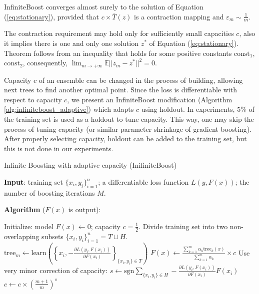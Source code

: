 
\begin{theorem}
InfiniteBoost converges almost surely to the solution of Equation (\ref{eq:stationary}),
provided that $c \times \overline{T}(z)$ is a contraction mapping and
$\varepsilon_m \sim \frac{1}{m}$.
\end{theorem}

The contraction requirement may hold only for sufficiently small capacities $c$,
also it implies there is one and only one solution $z^{*}$ of Equation (\ref{eq:stationary}).
Theorem follows from an inequality
that holds for some positive constants $\text{const}_1$, $\text{const}_2$,
consequently, $\lim_{m \to +\infty} \mathbb{E} || z_{m} - z^{*} ||^2 = 0$.

Capacity $c$ of an ensemble can be changed in the process of building,
allowing next trees to find another optimal point.
Since the loss is differentiable with respect to capacity $c$,
we present an InfiniteBoost modification (Algorithm \ref{alg:infiniteboost_adaptive}) which adapts $c$ using holdout.
In experiments, 5\% of the training set is used as a holdout to tune capacity.
This way, one may skip the process of tuning capacity (or similar parameter shrinkage of gradient boosting).
After properly selecting capacity, holdout can be added to the training set, but this is not done in our experiments.

\begin{algorithm}[!h]
  \caption{Infinite Boosting with adaptive capacity (InifiniteBoost)}\label{alg:infiniteboost_adaptive}
  {\bf Input}: training set $\{x_i, y_i\}_{i=1}^n$; a differentiable loss function $L(y, F(x))$; the number of boosting iterations $M$.

  {\bf Algorithm} ($F(x)$ is output):
  \begin{algorithmic}
    \State Initialize: model $F(x) \gets 0$; capacity $c=\frac{1}{2}$.
    \State Divide training set into two non-overlapping subsets $\{x_i, y_i\}_{i=1}^n=T\sqcup H$.
      \State $\text{tree}_m \gets \text{learn}\left(\left\{x_i, -\frac{\partial L(y_i, F(x_i))}{\partial F(x_i)}\right\}_{\{x_i, y_i\}\in T}\right)$
      \State $F(x) \gets \frac{\sum_{k=1}^m \alpha_k \text{tree}_k(x)}{\sum_{k=1}^m \alpha_k} \times c$
      \State Use very minor correction of capacity:
      \State $s \gets \text{sgn} \sum_{\{x_i, y_i\}\in H} -\frac{\partial L(y_i, F(x_i))}{\partial F(x_i)} F(x_i)$
      \State $c \gets c\times \left(\frac{m+1}{m}\right)^s$
    \EndFor
  \end{algorithmic}
\end{algorithm}

